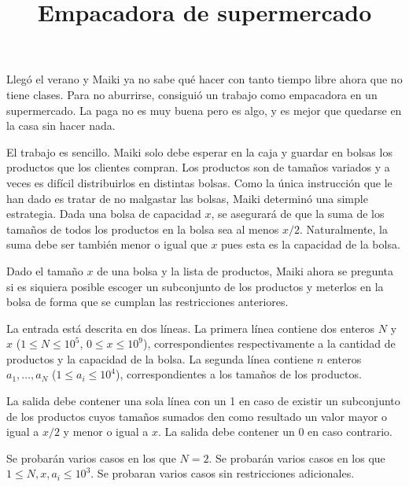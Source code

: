 \documentclass{oci}
\title{Empacadora de supermercado}
\begin{document}
\begin{problemDescription}
Llegó el verano y Maiki ya no sabe qué hacer con tanto tiempo libre ahora que no tiene clases.
Para no aburrirse, consiguió un trabajo como empacadora en un supermercado.
La paga no es muy buena pero es algo, y es mejor que quedarse en la casa sin hacer nada.

El trabajo es sencillo.
Maiki solo debe esperar en la caja y guardar en bolsas los productos que los clientes compran.
Los productos son de tamaños variados y a veces es difícil distribuirlos
en distintas bolsas.
Como la única instrucción que le han dado es tratar de no malgastar las bolsas,
Maiki determinó una simple estrategia.
Dada una bolsa de capacidad $x$, se asegurará de que la suma de los tamaños de todos los productos
en la bolsa sea al menos $x/2$.
Naturalmente, la suma debe ser también menor o igual que $x$ pues esta es la capacidad
de la bolsa.

Dado el tamaño $x$ de una bolsa y la lista de productos, Maiki ahora se pregunta si es siquiera
posible escoger un subconjunto de los productos y meterlos en la bolsa de forma que se cumplan
las restricciones anteriores.

\end{problemDescription}

\begin{inputDescription}
La entrada está descrita en dos líneas.
La primera línea contiene dos enteros $N$ y $x$ ($1\leq N\leq 10^5$, $0 \leq x \leq 10^9$),
correspondientes respectivamente a la cantidad de productos y la capacidad de la bolsa.
La segunda línea contiene $n$ enteros $a_1,\ldots, a_N$ ($1\leq a_i\leq 10^4$), correspondientes
a los tamaños de los productos.
\end{inputDescription}

\begin{outputDescription}
La salida debe contener una sola línea con un 1 en caso de existir un subconjunto de los productos
cuyos tamaños sumados den como resultado un valor mayor o igual a $x/2$ y menor o igual a $x$. 
La salida debe contener un 0 en caso contrario.
\end{outputDescription}

\begin{scoreDescription}
  Se probarán varios casos en los que $N = 2$.
  Se probarán varios casos en los que $1 \leq N, x, a_i \leq 10^3$.
  Se probaran varios casos sin restricciones adicionales.
\end{scoreDescription}

\begin{sampleDescription}
\end{sampleDescription}
\end{document}
